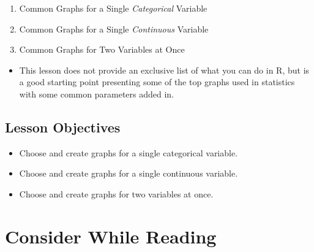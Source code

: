 \documentclass[
  letterpaper,
  DIV=11,
  numbers=noendperiod]{scrreprt}
\providecommand{\tightlist}{%
  \setlength{\itemsep}{0pt}\setlength{\parskip}{0pt}}\usepackage{longtable,booktabs,array}
\begin{document}
\begin{enumerate}
\def\labelenumi{\arabic{enumi}.}
\tightlist
\item
  Common Graphs for a Single \emph{Categorical} Variable
\item
  Common Graphs for a Single \emph{Continuous} Variable
\item
  Common Graphs for Two Variables at Once
\end{enumerate}

\begin{itemize}
\tightlist
\item
  This lesson does not provide an exclusive list of what you can do in
  R, but is a good starting point presenting some of the top graphs used
  in statistics with some common parameters added in.
\end{itemize}

\section{Lesson Objectives}\label{lesson-objectives-3}

\begin{itemize}
\tightlist
\item
  Choose and create graphs for a single categorical variable.
\item
  Choose and create graphs for a single continuous variable.
\item
  Choose and create graphs for two variables at once.
\end{itemize}


\chapter{Consider While Reading}\label{consider-while-reading-3}
\end{document}
